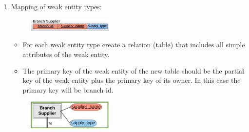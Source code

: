 \begin{enumerate}
    \item Mapping of weak entity types:
        \begin{figure}[H]
            \centering
            \includegraphics[width=0.4\textwidth]{./Figs/2020-12-24-23-00-07.png}
        \end{figure}
        \begin{itemize}
            \item For each weak entity type create a relation (table) that includes all simple attributes of the weak entity.
            \item The primary key of the weak entity of the new table should be the partial key of the weak entity plus the primary key of its owner. In this case the primary key will be branch id.
        \end{itemize}
        \begin{figure}[H]
            \centering
            \includegraphics[width=0.4\textwidth]{./Figs/2020-12-24-22-57-54.png}
        \end{figure}
    

\end{enumerate}
